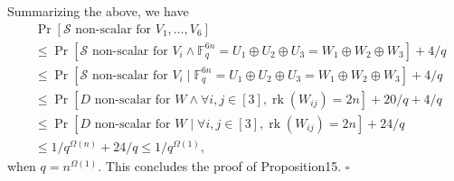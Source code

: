 Summarizing the above, we have
\begin{align*}
&\Pr[\mathcal S\text{ non-scalar for }V_1,\ldots,V_6]\\
&\le\Pr[\mathcal S\text{ non-scalar for }V_i\wedge\mathbb F_q^{6n}=U_1\oplus U_2\oplus U_3=W_1\oplus W_2\oplus W_3]+4/q\\
&\le\Pr[\mathcal S\text{ non-scalar for }V_i\mid\mathbb F_q^{6n}=U_1\oplus U_2\oplus U_3=W_1\oplus W_2\oplus W_3]+4/q\\
&\le\Pr[D\text{ non-scalar for }W\wedge\forall i,j\in[3],\operatorname{rk}(W_{ij})=2n]+20/q+4/q\\
&\le\Pr[D\text{ non-scalar for }W\mid\forall i,j\in[3],\operatorname{rk}(W_{ij})=2n]+24/q\\
&\le1/q^{\Omega(n)}+24/q\le1/q^{\Omega(1)},
\end{align*}
when $q=n^{\Omega(1)}$. This concludes the proof of Proposition15. \hfill$\square$
